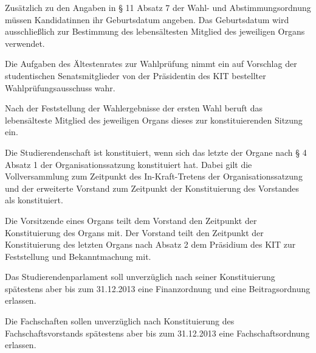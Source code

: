 \begin{contract}
Zusätzlich zu den Angaben in  § 11 Absatz 7 der Wahl- und Abstimmungsordnung müssen Kandidatinnen ihr Geburtsdatum angeben. Das Geburtsdatum wird ausschließlich zur Bestimmung des lebensältesten Mitglied des jeweiligen Organs verwendet.

Die Aufgaben des Ältestenrates  zur Wahlprüfung nimmt ein auf Vorschlag der studentischen Senatsmitglieder von der Präsidentin des KIT bestellter Wahlprüfungsausschuss wahr.


\label{konstituierung}

Nach der Feststellung der Wahlergebnisse der ersten Wahl beruft das lebensälteste Mitglied des jeweiligen Organs dieses zur konstituierenden Sitzung ein.

Die Studierendenschaft ist konstituiert, wenn sich das letzte der Organe nach § 4 Absatz 1 der Organisationssatzung konstituiert hat. Dabei gilt die Vollversammlung zum Zeitpunkt des In-Kraft-Tretens der Organisationssatzung und der erweiterte Vorstand zum Zeitpunkt der Konstituierung des Vorstandes als konstituiert.

Die Vorsitzende eines Organs teilt dem Vorstand den Zeitpunkt der Konstituierung des Organs mit. Der Vorstand teilt den Zeitpunkt der Konstituierung des letzten Organs nach Absatz 2 dem Präsidium des KIT zur Feststellung und Bekanntmachung mit.


Das Studierendenparlament soll unverzüglich nach seiner Konstituierung spätestens aber bis zum 31.12.2013 eine Finanzordnung und eine Beitragsordnung erlassen.

Die Fachschaften sollen unverzüglich nach Konstituierung des Fachschaftsvorstands spätestens aber bis zum 31.12.2013 eine Fachschaftsordnung erlassen.

\end{contract}

